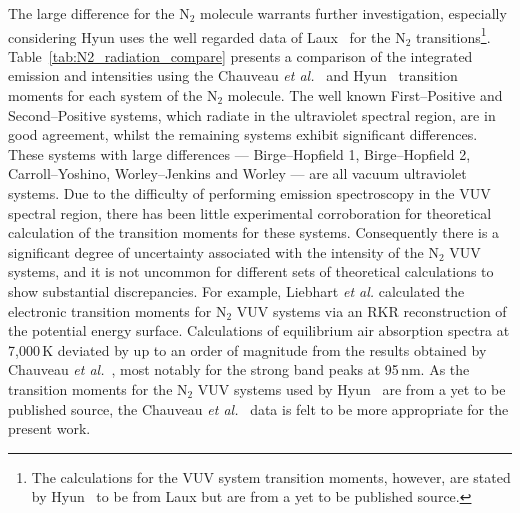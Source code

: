 \par

The large difference for the N$_2$ molecule warrants further investigation, especially considering Hyun uses the well regarded data of Laux~\cite{laux_1993,LK1992} for the N$_2$ transitions\footnote{The calculations for the VUV system transition moments, however, are stated by Hyun~\cite{hyun_phd} to be from Laux but are from a yet to be published source.}.
Table~\ref{tab:N2_radiation_compare} presents a comparison of the integrated emission and intensities using the Chauveau \textit{et al.}~\cite{CPR+2002} and Hyun~\cite{hyun_phd} transition moments for each system of the N$_2$ molecule.
The well known First--Positive and Second--Positive systems, which radiate in the ultraviolet spectral region, are in good agreement, whilst the remaining systems exhibit significant differences.
These systems with large differences --- Birge--Hopfield 1, Birge--Hopfield 2, Carroll--Yoshino, Worley--Jenkins and Worley --- are all vacuum ultraviolet systems.
Due to the difficulty of performing emission spectroscopy in the VUV spectral region, there has been little experimental corroboration for theoretical calculation of the transition moments for these systems.
Consequently there is a significant degree of uncertainty associated with the intensity of the N$_2$ VUV systems, and it is not uncommon for different sets of theoretical calculations to show substantial discrepancies.  
For example, Liebhart \textit{et al.} calculated the electronic transition moments for N$_2$ VUV systems via an RKR reconstruction of the potential energy surface.
Calculations of equilibrium air absorption spectra at 7,000\,K deviated by up to an order of magnitude from the results obtained by Chauveau \textit{et al.}~\cite{CPR+2002}, most notably for the strong band peaks at 95\,nm.
As the transition moments for the N$_2$ VUV systems used by Hyun~\cite{hyun_phd} are from a yet to be published source, the Chauveau \textit{et al.}~\cite{CPR+2002} data is felt to be more appropriate for the present work.

